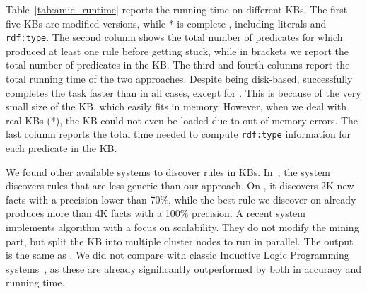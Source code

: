 Table~\ref{tab:amie_runtime} reports the running time on different KBs. The first five KBs are \amie modified versions, while * is complete \yago, including literals and \texttt{rdf:type}. 
The second column shows the total number of predicates for which \amie produced at least one rule before getting stuck, while in brackets we report the total number of predicates in the KB.
%
The third and fourth columns report the total running time of the two approaches. Despite being disk-based, \krd successfully completes the task faster than \amie in all cases, except for . This is because of the very small size of the KB, which easily fits in 
memory. However, when we deal with real KBs (*), the KB could not even be loaded due to out of memory errors. The last column reports the total time needed to compute \texttt{rdf:type} information for each predicate in the KB. 

We found other available systems to discover rules in KBs. In~\cite{abedjan2014amending}, the system discovers %
rules that are less generic than our approach. On \amie {}, it discovers 2K new facts with a precision lower than 70\%, while the best rule we discover on  already produces more than 4K facts with a 100\% precision. 
A recent system~\cite{Chen:2016} implements \amie algorithm with a focus on scalability. They do not modify the mining part, but split the KB into multiple cluster nodes to run in parallel. The output is the same as \amie. We did not compare with classic Inductive Logic Programming systems~\cite{dehaspe1999discovery}, as these are already significantly outperformed by \amie both in accuracy and running time.

